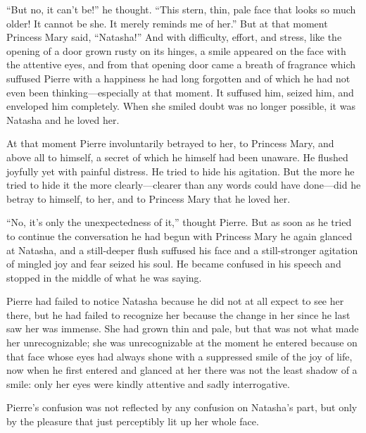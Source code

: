 ``But no, it can't be!'' he thought. ``This stern, thin, pale
face that looks so much older! It cannot be she. It merely
reminds me of her.'' But at that moment Princess Mary said,
``Natasha!'' And with difficulty, effort, and stress, like the
opening of a door grown rusty on its hinges, a smile appeared on
the face with the attentive eyes, and from that opening door came
a breath of fragrance which suffused Pierre with a happiness he
had long forgotten and of which he had not even been
thinking---especially at that moment. It suffused him, seized
him, and enveloped him completely. When she smiled doubt was no
longer possible, it was Natasha and he loved her.

At that moment Pierre involuntarily betrayed to her, to Princess
Mary, and above all to himself, a secret of which he himself had
been unaware.  He flushed joyfully yet with painful distress. He
tried to hide his agitation. But the more he tried to hide it the
more clearly---clearer than any words could have done---did he
betray to himself, to her, and to Princess Mary that he loved
her.

``No, it's only the unexpectedness of it,'' thought Pierre. But
as soon as he tried to continue the conversation he had begun
with Princess Mary he again glanced at Natasha, and a
still-deeper flush suffused his face and a still-stronger
agitation of mingled joy and fear seized his soul. He became
confused in his speech and stopped in the middle of what he was
saying.

Pierre had failed to notice Natasha because he did not at all
expect to see her there, but he had failed to recognize her
because the change in her since he last saw her was immense. She
had grown thin and pale, but that was not what made her
unrecognizable; she was unrecognizable at the moment he entered
because on that face whose eyes had always shone with a
suppressed smile of the joy of life, now when he first entered
and glanced at her there was not the least shadow of a smile:
only her eyes were kindly attentive and sadly interrogative.

Pierre's confusion was not reflected by any confusion on
Natasha's part, but only by the pleasure that just perceptibly
lit up her whole face.


